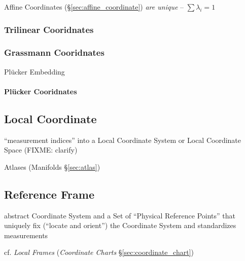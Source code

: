 Affine Coordinates (\S\ref{sec:affine_coordinate}) \emph{are unique} --
$\sum \lambda_i = 1$



\subsubsection{Trilinear Cooridnates}\label{sec:trilinear_coordinates}

\subsubsection{Grassmann Cooridnates}\label{sec:grassmann_coordinates}

Pl\"ucker Embedding



\paragraph{Pl\"ucker Cooridnates}\label{sec:plucker_coordinates}\hfill



\subsection{Local Coordinate}\label{sec:local_coordinate}

``measurement indices'' into a Local Coordinate System or Local Coordinate Space
(FIXME: clarify)

\fist Atlases (Manifolds \S\ref{sec:atlas})



\subsection{Reference Frame}\label{sec:reference_frame}

abstract Coordinate System and a Set of ``Physical Reference Points'' that
uniquely fix (``locate and orient'') the Coordinate System and standardizes
measurements

cf. \emph{Local Frames} (\emph{Coordinate Charts} \S\ref{sec:coordinate_chart})



